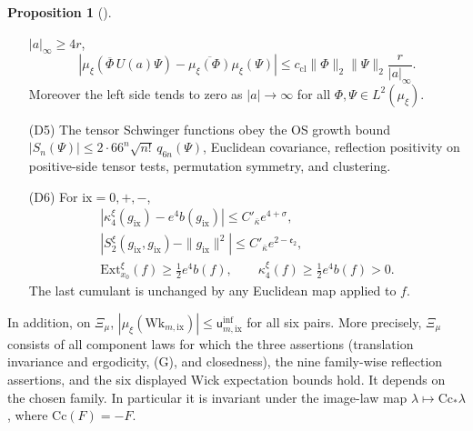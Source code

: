 \documentclass[11pt,letterpaper,reqno]{amsart}
\theoremstyle{definition}
\newtheorem{qcmproposition}{Proposition}[section]
\newenvironment{proposition}[1][]{\pushQED{\qed}\renewcommand{\qedsymbol}{$\blacksquare$}\begin{qcmproposition}[#1]}{\popQED\end{qcmproposition}}
\begin{document}
\begin{proposition}
\begin{itemize}
$|a|_\infty\ge4r$,
\[
 \left|\mu_\xi(\overline\Phi\,U(a)\Psi)
              -\overline{\mu_\xi(\Phi)}\mu_\xi(\Psi)\right|
 \le c_{\mathrm{cl}}\|\Phi\|_2\|\Psi\|_2
                      \frac r{|a|_\infty}.
\]
Moreover the left side tends to zero as $|a|\to\infty$ for
all $\Phi,\Psi\in L^2(\mu_\xi)$.
\item[(D5)] The tensor Schwinger functions obey the OS growth
bound $|S_n(\Psi)|\le2\cdot66^n\sqrt{n!}\,q_{6n}(\Psi)$,
Euclidean covariance, reflection positivity on positive-side
tensor tests, permutation symmetry, and clustering.
\item[(D6)] For $\mathrm{ix}=0,+,-$,
\begin{gather*}
 |\kappa_4^\xi(g_{\mathrm{ix}})-e^4b(g_{\mathrm{ix}})|
       \le C'_{\bar\kappa}e^{4+\sigma},\\
 |S_2^\xi(g_{\mathrm{ix}},g_{\mathrm{ix}})
                 -\|g_{\mathrm{ix}}\|^2|
       \le C'_{\bar\kappa}e^{2-\mathfrak e_2},\\
 \mathrm{Ext}_{x_0}^\xi(f)\ge\tfrac12e^4b(f),\qquad
 \kappa_4^\xi(f)\ge\tfrac12e^4b(f)>0.
\end{gather*}
The last cumulant is unchanged by any Euclidean map applied to $f$.
\end{itemize}
In addition, on $\Xi_\mu$,
$|\mu_\xi(\mathrm{Wk}_{m,\mathrm{ix}})|
\le\mathsf u^{\mathrm{inf}}_{m,\mathrm{ix}}$ for all six pairs.
More precisely, $\Xi_\mu$ consists of all component laws for
which the three assertions (translation invariance and
ergodicity, (G), and closedness), the nine family-wise
reflection assertions, and the six displayed Wick expectation
bounds hold. It depends on the chosen family.
In particular it is invariant under the image-law map
$\lambda\mapsto\mathrm{Cc}_*\lambda$, where
$\mathrm{Cc}(F)=-F$.
\end{proposition}
\end{document}
